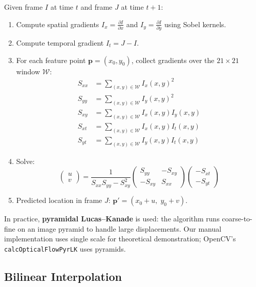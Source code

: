 \documentclass[12pt, a4paper]{article}
\begin{document}
Given frame $I$ at time $t$ and frame $J$ at time $t+1$:
\begin{enumerate}
  \item Compute spatial gradients $I_x = \frac{\partial I}{\partial x}$ and $I_y = \frac{\partial I}{\partial y}$ using Sobel kernels.
  \item Compute temporal gradient $I_t = J - I$.
  \item For each feature point $\mathbf{p} = (x_0, y_0)$, collect gradients over the $21 \times 21$ window $\mathcal{W}$:
  \begin{align}
    S_{xx} &= \sum_{(x,y) \in \mathcal{W}} I_x(x,y)^2 \\
    S_{yy} &= \sum_{(x,y) \in \mathcal{W}} I_y(x,y)^2 \\
    S_{xy} &= \sum_{(x,y) \in \mathcal{W}} I_x(x,y) I_y(x,y) \\
    S_{xt} &= \sum_{(x,y) \in \mathcal{W}} I_x(x,y) I_t(x,y) \\
    S_{yt} &= \sum_{(x,y) \in \mathcal{W}} I_y(x,y) I_t(x,y)
  \end{align}
  \item Solve:
  \[
    \begin{pmatrix} u \\ v \end{pmatrix} =
    \frac{1}{S_{xx}S_{yy} - S_{xy}^2}
    \begin{pmatrix} S_{yy} & -S_{xy} \\ -S_{xy} & S_{xx} \end{pmatrix}
    \begin{pmatrix} -S_{xt} \\ -S_{yt} \end{pmatrix}
  \]
  \item Predicted location in frame $J$: $\mathbf{p}' = (x_0 + u,\; y_0 + v)$.
\end{enumerate}

In practice, \textbf{pyramidal Lucas--Kanade} is used: the algorithm runs coarse-to-fine on an image pyramid to handle large displacements.  Our manual implementation uses single scale for theoretical demonstration; OpenCV's \texttt{calcOpticalFlowPyrLK} uses pyramids.

\subsection{Bilinear Interpolation}
\label{sec:bilinear}
\end{document}
